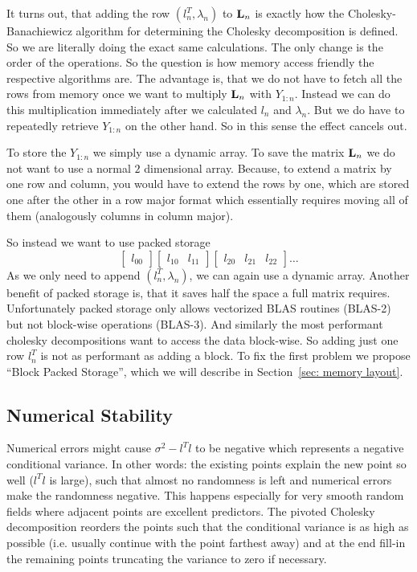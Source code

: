 It turns out, that adding the row \((l_n^T ,\lambda_n)\) to \(\mathbf{L}_n\) is exactly
how the Cholesky-Banachiewicz algorithm for determining the Cholesky
decomposition is defined. So we are literally doing the exact same calculations.
The only change is the order of the operations. So the question is how memory
access friendly the respective algorithms are. The advantage is, that we do not
have to fetch all the rows from memory once we want to multiply
\(\mathbf{L}_n\) with \(Y_{1:n}\). Instead we can do this multiplication immediately after
we calculated \(l_n\) and \(\lambda_n\). But we do have to repeatedly retrieve
\(Y_{1:n}\) on the other hand. So in this sense the effect cancels out.

To store the \(Y_{1:n}\) we simply use a dynamic array. To save the matrix \(\mathbf{L}_n\)
we do not want to use a normal \(2\) dimensional array. Because, to extend a
matrix by one row and column, you would have to extend the rows by one, which
are stored one after the other in a row major format which essentially
requires moving all of them (analogously columns in column major).

So instead we want to use packed storage
\[
	\begin{bmatrix}
		l_{00}	
	\end{bmatrix}
	\begin{bmatrix}
		l_{10} & l_{11}
	\end{bmatrix}
	\begin{bmatrix}
		l_{20} & l_{21} & l_{22}
	\end{bmatrix}
	\dots
\]
As we only need to append \((l_n^T, \lambda_n)\), we can again use a dynamic
array. Another benefit of packed storage is, that it saves half the space a
full matrix requires. Unfortunately packed storage only allows vectorized BLAS routines
(BLAS-2) but not block-wise operations (BLAS-3). And similarly the most performant
cholesky decompositions want to access the data block-wise. So adding just one
row \(l_n^T\) is not as performant as adding a block. To fix the first problem
we propose ``Block Packed Storage'', which we will describe in Section~\ref{sec: memory
layout}.

\subsection{Numerical Stability}

Numerical errors might cause \(\sigma^2 - l^T l\) to be negative which
represents a negative conditional variance. In other words: the existing points
explain the new point so well (\(l^Tl\) is large), such that almost no
randomness is left and numerical errors make the randomness negative. This
happens especially for very smooth random fields where adjacent points are
excellent predictors. The pivoted Cholesky decomposition reorders the points
such that the conditional variance is as high as possible (i.e. usually continue
with the point farthest away) and at the end fill-in the remaining points
truncating the variance to zero if necessary.

